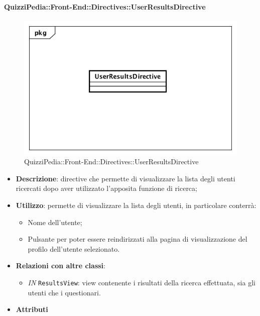 \paragraph{QuizziPedia::Front-End::Directives::UserResultsDirective}

\label{QuizziPedia::Front-End::Directives::UserResultsDirective}

\begin{figure}[h]
	\centering
	\includegraphics[scale=0.5,keepaspectratio]{UML/Classi/Front-End/QuizziPedia_Front-end_Directives_UserResultsDirective.png}
	\caption{QuizziPedia::Front-End::Directives::UserResultsDirective}
\end{figure}

\begin{itemize}
	\item \textbf{Descrizione}: directive che permette di visualizzare la lista degli utenti ricercati dopo aver utilizzato l'apposita funzione di ricerca;
	\item \textbf{Utilizzo}: permette di visualizzare la lista degli utenti, in particolare conterrà:
	\begin{itemize}
		\item Nome dell'utente;
		\item Pulsante per poter essere reindirizzati alla pagina di visualizzazione del profilo dell'utente selezionato.
	\end{itemize}
	\item \textbf{Relazioni con altre classi}:
	\begin{itemize}
		\item \textit{IN} \texttt{ResultsView}: view contenente i risultati della ricerca effettuata, sia gli utenti che i questionari.
	\end{itemize}
	\item \textbf{Attributi}
\end{itemize}
